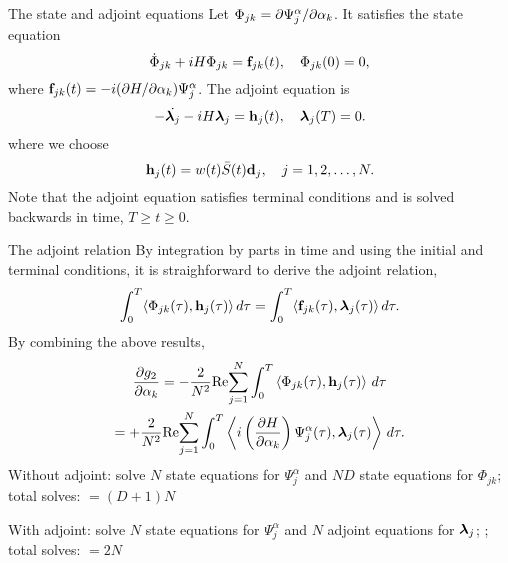 \documentclass{beamer}
\begin{document}
\begin{frame}{The state and adjoint equations}
 Let $\Phi_{jk} = \partial \Psi_j^\alpha / \partial \alpha_k$. It satisfies the state equation
 \[
 \dot{\Phi}_{jk} + i H \Phi_{jk} = {\bf f}_{jk}(t), \quad \Phi_{jk}(0) = 0,
  \]
  where ${\bf f}_{jk}(t) = -i(\partial H / \partial \alpha_k) \Psi_j^{\alpha}$. The adjoint equation is
  \[
  - \dot{\boldsymbol{\lambda}_j} - i H \boldsymbol{\lambda}_j = {\bf h}_j(t),\quad \boldsymbol{\lambda}_j(T) = 0.
  \]
  where we choose
  \[
  {\bf h}_j(t) = w(t) \bar{S}(t) {\bf d}_j,\quad j=1,2,\ldots,N.
  \]
  Note that the adjoint equation satisfies terminal conditions and is solved backwards in time,
  $T\geq t \geq 0$.

\end{frame}

\begin{frame}{The adjoint relation}
By integration by parts in time and using the initial and terminal conditions, it is straighforward
to derive the adjoint relation,
\[
\int_0^T \langle \Phi_{jk}(\tau), {\bf h}_j(\tau) \rangle\, d\tau =
\int_0^T \langle {\bf f}_{jk}(\tau), \boldsymbol{\lambda}_j(\tau) \rangle\, d\tau.
\]
By combining the above results,
\begin{multline*}
  \frac{\partial g_2}{\partial \alpha_k} 
  = -\frac{2}{N^2} {\rm Re\!} \sum_{j=1}^{N}  \int_0^T  \left\langle
  \Phi_{jk}(\tau),  {\bf h}_j(\tau) \right\rangle \, d\tau  \\
  = +\frac{2}{N^2} {\rm Re\!} \sum_{j=1}^{N}  \int_0^T  \left\langle
  i\left(\frac{\partial H}{\partial \alpha_k}\right) \Psi_j^{\alpha}(\tau), \boldsymbol{\lambda}_j(\tau) \right\rangle \, d\tau.
\end{multline*}
Without adjoint: solve $N$ state equations for $\Psi_j^\alpha$ and $N D$ state equations for
$\Phi_{jk}$; total solves: $=(D+1)N$

With adjoint: solve $N$ state equations for $\Psi_j^\alpha$ and $N$ adjoint equations for
$\boldsymbol{\lambda}_j$; ; total solves: $=2N$

\end{frame}
\end{document}
